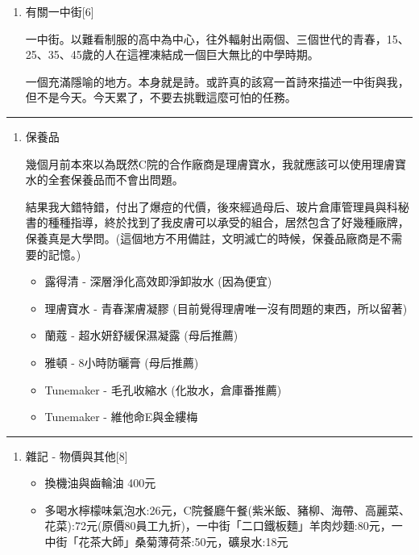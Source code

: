 \documentclass[
]{article}
\providecommand{\tightlist}{%
  \setlength{\itemsep}{0pt}\setlength{\parskip}{0pt}}
\begin{document}
\begin{enumerate}
\def\labelenumi{\arabic{enumi}.}
\setcounter{enumi}{2}
\item
  有關一中街{[}6{]}

  一中街。以難看制服的高中為中心，往外輻射出兩個、三個世代的青春，15、25、35、45歲的人在這裡凍結成一個巨大無比的中學時期。

  一個充滿隱喻的地方。本身就是詩。或許真的該寫一首詩來描述一中街與我，但不是今天。今天累了，不要去挑戰這麼可怕的任務。
\end{enumerate}

\begin{center}\rule{0.5\linewidth}{\linethickness}\end{center}

\begin{enumerate}
\def\labelenumi{\arabic{enumi}.}
\setcounter{enumi}{3}
\item
  保養品

  幾個月前本來以為既然C院的合作廠商是理膚寶水，我就應該可以使用理膚寶水的全套保養品而不會出問題。

  結果我大錯特錯，付出了爆痘的代價，後來經過母后、玻片倉庫管理員與科秘書的種種指導，終於找到了我皮膚可以承受的組合，居然包含了好幾種廠牌，保養真是大學問。(這個地方不用備註，文明滅亡的時候，保養品廠商是不需要的記憶。)

  \begin{itemize}
  \tightlist
  \item
    露得清 - 深層淨化高效即淨卸妝水 (因為便宜)
  \item
    理膚寶水 - 青春潔膚凝膠 (目前覺得理膚唯一沒有問題的東西，所以留著)
  \item
    蘭蔻 - 超水妍舒緩保濕凝露 (母后推薦)
  \item
    雅頓 - 8小時防曬膏 (母后推薦)
  \item
    Tunemaker - 毛孔收縮水 (化妝水，倉庫番推薦)
  \item
    Tunemaker - 維他命E與金縷梅
  \end{itemize}
\end{enumerate}

\begin{center}\rule{0.5\linewidth}{\linethickness}\end{center}

\begin{enumerate}
\def\labelenumi{\arabic{enumi}.}
\setcounter{enumi}{4}
\item
  雜記 - 物價與其他{[}8{]}

  \begin{itemize}
  \tightlist
  \item
    換機油與齒輪油 400元
  \item
    多喝水檸檬味氣泡水:26元，C院餐廳午餐(紫米飯、豬柳、海帶、高麗菜、花菜):72元(原價80員工九折)，一中街「二口鐵板麵」羊肉炒麵:80元，一中街「花茶大師」桑菊薄荷茶:50元，礦泉水:18元
  \end{itemize}
\end{enumerate}
\end{document}

